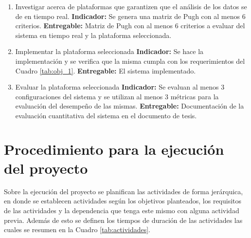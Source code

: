 \documentclass[12pt]{article}
\begin{document}
\begin{enumerate}
  \item Investigar acerca de plataformas que garantizen que el análisis de los datos se de en tiempo real. \newline
        \textbf{Indicador:} Se genera una matriz de Pugh con al menos 6 criterios.\newline
        \textbf{Entregable:} Matriz de Pugh con al menos 6 criterios a evaluar del sistema en tiempo real y la plataforma seleccionada.
  \item Implementar la plataforma seleccionada \newline
        \textbf{Indicador:} Se hace la implementación y se verifica que la misma cumpla con los requerimientos del Cuadro \ref{tab:obj_1}.\newline
        \textbf{Entregable:} El sistema implementado.
  \item Evaluar la plataforma seleccionada \newline
        \textbf{Indicador:} Se evaluan al menos 3 configuraciones del sistema y se utilizan al menos 3 métricas para la evaluación del desempeño de las mismas.\newline
        \textbf{Entregable:} Documentación de la evaluación cuantitativa del sistema en el documento de tesis.
\end{enumerate}

\section{Procedimiento para la ejecución del proyecto}

Sobre la ejecución del proyecto se planifican las actividades de forma jerárquica, en donde se establecen actividades según los objetivos planteados, los requisitos de las actividades y la dependencia que tenga este mismo con alguna actividad previa. Además de esto se definen los tiempos de duración de las actividades las cuales se resumen en la Cuadro \ref{tab:actividades}.
\end{document}
